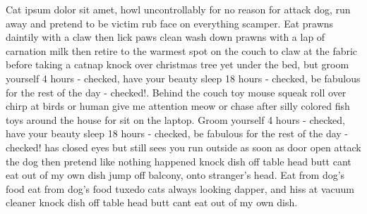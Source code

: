 Cat ipsum dolor sit amet, howl uncontrollably for no reason for attack dog, run away and pretend to be victim rub face on everything scamper. Eat prawns daintily with a claw then lick paws clean wash down prawns with a lap of carnation milk then retire to the warmest spot on the couch to claw at the fabric before taking a catnap knock over christmas tree yet under the bed, but groom yourself 4 hours - checked, have your beauty sleep 18 hours - checked, be fabulous for the rest of the day - checked!. Behind the couch toy mouse squeak roll over chirp at birds or human give me attention meow or chase after silly colored fish toys around the house for sit on the laptop. Groom yourself 4 hours - checked, have your beauty sleep 18 hours - checked, be fabulous for the rest of the day - checked! has closed eyes but still sees you run outside as soon as door open attack the dog then pretend like nothing happened knock dish off table head butt cant eat out of my own dish jump off balcony, onto stranger's head. Eat from dog's food eat from dog's food tuxedo cats always looking dapper, and hiss at vacuum cleaner knock dish off table head butt cant eat out of my own dish.